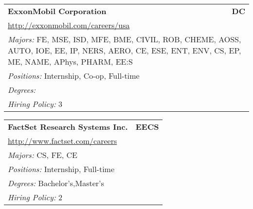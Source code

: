\documentclass[twoside]{article}
\begin{document}
\begin{center}
\begin{multicols}{3}
\begin{FlushLeft}
\begin{minipage}{.9\columnwidth}
\end{minipage}
 
\begin{minipage}{.9\columnwidth}\begin{tabularx}{.95\columnwidth}{Xr}
                 {\Large\bf ExxonMobil Corporation} & {\Large\bf DC}\\
    \multicolumn{2}{p{.95\columnwidth}}{\url{http://exxonmobil.com/careers/usa}}\\
    \multicolumn{2}{p{.95\columnwidth}}{\emph{Majors:} FE, MSE, ISD, MFE, BME, CIVIL, ROB, CHEME, AOSS, AUTO, IOE, EE, IP, NERS, AERO, CE, ESE, ENT, ENV, CS, EP, ME, NAME, APhys, PHARM, EE:S}\\
    \multicolumn{2}{p{.95\columnwidth}}{\emph{Positions:} Internship, Co-op, Full-time}\\
    \multicolumn{2}{p{.95\columnwidth}}{\emph{Degrees:} }\\
    \multicolumn{2}{p{.95\columnwidth}}{\emph{Hiring Policy:} 3}\\
    \end{tabularx}
    
\end{minipage}
 
\begin{minipage}{.9\columnwidth}\begin{tabularx}{.95\columnwidth}{Xr}
                 {\Large\bf FactSet Research Systems Inc.} & {\Large\bf EECS}\\
    \multicolumn{2}{p{.95\columnwidth}}{\url{http://www.factset.com/careers}}\\
    \multicolumn{2}{p{.95\columnwidth}}{\emph{Majors:} CS, FE, CE}\\
    \multicolumn{2}{p{.95\columnwidth}}{\emph{Positions:} Internship, Full-time}\\
    \multicolumn{2}{p{.95\columnwidth}}{\emph{Degrees:} Bachelor's,Master's}\\
    \multicolumn{2}{p{.95\columnwidth}}{\emph{Hiring Policy:} 2}\\
    \end{tabularx}
    
\end{minipage}
 

\end{FlushLeft}
\end{multicols}
\end{center}
\end{document}
